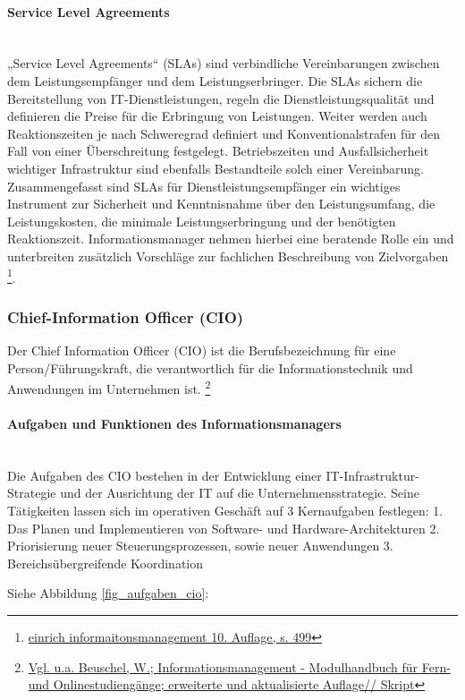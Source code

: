 \paragraph{Service Level Agreements}\mbox{}\\
„Service Level Agreements“ (SLAs) sind verbindliche Vereinbarungen zwischen dem Leistungsempfänger und dem Leistungserbringer. Die SLAs sichern die Bereitstellung von IT-Dienstleistungen, regeln die Dienstleistungsqualität und definieren die Preise für die Erbringung von Leistungen. Weiter werden auch Reaktionszeiten je nach Schweregrad definiert und Konventionalstrafen für den Fall von einer Überschreitung festgelegt. Betriebszeiten und Ausfallsicherheit wichtiger Infrastruktur sind ebenfalls Bestandteile solch einer Vereinbarung.
Zusammengefasst sind SLAs für Dienstleistungsempfänger ein wichtiges Instrument zur Sicherheit und Kenntnisnahme über den Leistungsumfang, die Leistungskosten, die minimale Leistungserbringung und der benötigten Reaktionszeit. Informationsmanager nehmen hierbei eine beratende Rolle ein und unterbreiten zusätzlich Vorschläge zur fachlichen Beschreibung von Zielvorgaben \footnote{\url{einrich informaitonsmanagement 10. Auflage, s. 499}}.


\subsubsection{Chief-Information Officer (CIO)}
\label{cio_text}
Der Chief Information Officer (CIO) ist die Berufsbezeichnung für eine Person/Führungskraft, die verantwortlich für die Informationstechnik und Anwendungen im Unternehmen ist. \footnote{\url{Vgl. u.a. Beuschel, W.; Informationsmanagement - Modulhandbuch für Fern- und Onlinestudiengänge; erweiterte und aktualisierte Auflage// Skript}}


\paragraph{Aufgaben und Funktionen des Informationsmanagers}\mbox{}\\
Die Aufgaben des CIO bestehen in der Entwicklung einer IT-Infrastruktur-Strategie und der Ausrichtung der IT auf die Unternehmensstrategie. Seine Tätigkeiten lassen sich im operativen Geschäft auf 3 Kernaufgaben festlegen: 
1.	Das Planen und Implementieren von Software- und Hardware-Architekturen 
2.	Priorisierung neuer Steuerungsprozessen, sowie neuer Anwendungen
3.	Bereichsübergreifende Koordination

Siehe Abbildung \ref{fig_aufgaben_cio}:


